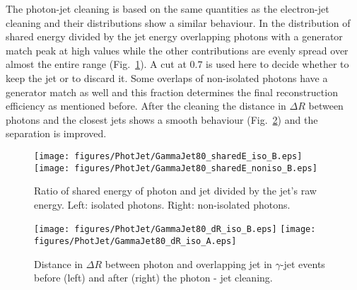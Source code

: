 \documentclass{cmspaper}
\begin{document}
The photon-jet cleaning is based on the same quantities as the electron-jet
cleaning and their distributions show a similar behaviour. In the distribution
of shared energy divided by the jet energy overlapping photons with a generator
match peak at high values while the other contributions are evenly spread over
almost the entire range (Fig.~\ref{fig:pjSharedE}). A cut at $0.7$ is used
here to decide whether to keep the jet or to discard it. Some overlaps of
non-isolated photons have a generator match as well and this fraction
determines the final reconstruction efficiency as mentioned before. After the
cleaning the distance in $\Delta R$ between photons and the closest jets shows
a smooth behaviour (Fig.~\ref{fig:pjDeltaR}) and the separation is improved. 
\begin{figure}[hbtp]
  \begin{center}
    \texttt{[image: figures/PhotJet/GammaJet80\_sharedE\_iso\_B.eps]}
    \texttt{[image: figures/PhotJet/GammaJet80\_sharedE\_noniso\_B.eps]}
    \caption{Ratio of shared energy of photon and jet divided by the jet's raw
    energy. Left: isolated photons. Right: non-isolated photons.}
    \label{fig:pjSharedE}
  \end{center}
\end{figure}
\begin{figure}[hbtp]
  \begin{center}
    \texttt{[image: figures/PhotJet/GammaJet80\_dR\_iso\_B.eps]}
    \texttt{[image: figures/PhotJet/GammaJet80\_dR\_iso\_A.eps]}
    \caption{Distance in $\Delta R$ between photon and overlapping jet in
    $\gamma$-jet events before (left) and after (right) the photon - jet cleaning.}
    \label{fig:pjDeltaR}
  \end{center}
\end{figure}
\end{document}
